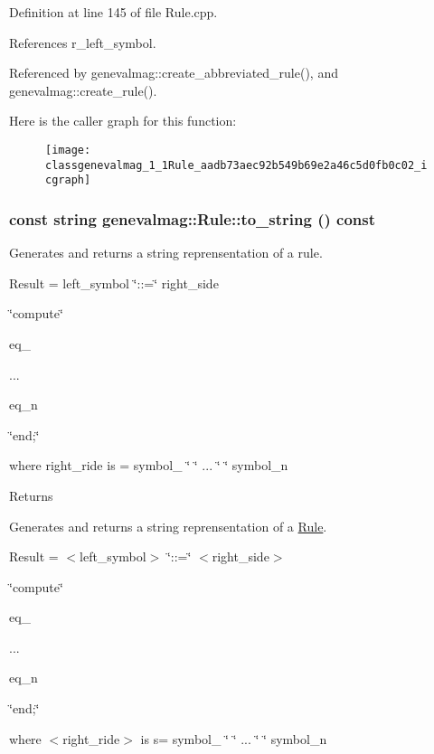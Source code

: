 Definition at line 145 of file Rule.cpp.



References r\_\-left\_\-symbol.



Referenced by genevalmag::create\_\-abbreviated\_\-rule(), and genevalmag::create\_\-rule().



Here is the caller graph for this function:\nopagebreak
\begin{figure}[H]
\begin{center}
\leavevmode
\texttt{[image: classgenevalmag\_1\_1Rule\_aadb73aec92b549b69e2a46c5d0fb0c02\_icgraph]}
\end{center}
\end{figure}


\hypertarget{classgenevalmag_1_1Rule_a5efc9f6c6c576c52937ece211333a743}{
\subsubsection[{to\_\-string}]{\setlength{\rightskip}{0pt plus 5cm}const string genevalmag::Rule::to\_\-string () const}}
\label{classgenevalmag_1_1Rule_a5efc9f6c6c576c52937ece211333a743}
Generates and returns a string reprensentation of a rule.\par
 \par
 Result = left\_\-symbol \char`\"{}::=\char`\"{} right\_\-side\par
 \char`\"{}compute\char`\"{}\par
 eq\_\par
 ...\par
 eq\_\-n\par
 \char`\"{}end;\char`\"{}\par
 \par
 where right\_\-ride is = symbol\_ \char`\"{} \char`\"{} ... \char`\"{} \char`\"{} symbol\_\-n\par


\begin{DoxyReturn}{Returns}

\end{DoxyReturn}
Generates and returns a string reprensentation of a \hyperlink{classgenevalmag_1_1Rule}{Rule}.\par
 \par
 Result = $<$left\_\-symbol$>$ \char`\"{}::=\char`\"{} $<$right\_\-side$>$\par
 \char`\"{}compute\char`\"{}\par
 eq\_\par
 ...\par
 eq\_\-n\par
 \char`\"{}end;\char`\"{}\par
 \par
 where $<$right\_\-ride$>$ is s= symbol\_ \char`\"{} \char`\"{} ... \char`\"{} \char`\"{} symbol\_\-n\par
 

